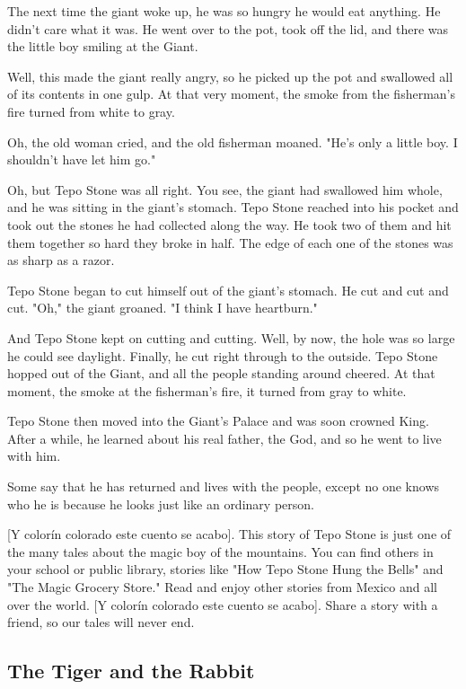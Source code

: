 The next time the giant woke up, he was so hungry he would eat anything. He didn't care what it was. He went over to the pot, took off the lid, and there was the little boy smiling at the Giant.

Well, this made the giant really angry, so he picked up the pot and swallowed all of its contents in one gulp. At that very moment, the smoke from the fisherman's fire turned from white to gray.

Oh, the old woman cried, and the old fisherman moaned. "He's only a little boy. I shouldn't have let him go."

Oh, but Tepo Stone was all right. You see, the giant had swallowed him whole, and he was sitting in the giant's stomach. Tepo Stone reached into his pocket and took out the stones he had collected along the way. He took two of them and hit them together so hard they broke in half. The edge of each one of the stones was as sharp as a razor.

Tepo Stone began to cut himself out of the giant's stomach. He cut and cut and cut. "Oh," the giant groaned. "I think I have heartburn."

And Tepo Stone kept on cutting and cutting. Well, by now, the hole was so large he could see daylight. Finally, he cut right through to the outside. Tepo Stone hopped out of the Giant, and all the people standing around cheered. At that moment, the smoke at the fisherman's fire, it turned from gray to white.

Tepo Stone then moved into the Giant's Palace and was soon crowned King. After a while, he learned about his real father, the God, and so he went to live with him.

Some say that he has returned and lives with the people, except no one knows who he is because he looks just like an ordinary person.

    [Y colorín colorado este cuento se acabo]. This story of Tepo Stone is just one of the many tales about the magic boy of the mountains. You can find others in your school or public library, stories like "How Tepo Stone Hung the Bells" and "The Magic Grocery Store." Read and enjoy other stories from Mexico and all over the world.  [Y colorín colorado este cuento se acabo]. Share a story with a friend, so our tales will never end.

\subsection{The Tiger and the Rabbit}

